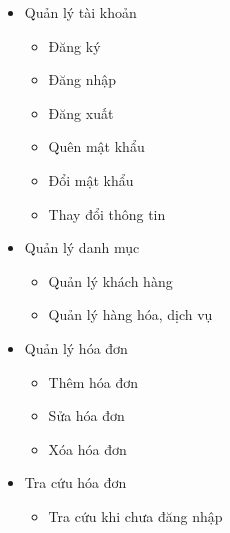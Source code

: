 
\begin{itemize}

    \item Quản lý tài khoản

          \begin{itemize}

              \item Đăng ký

              \item Đăng nhập

              \item Đăng xuất

              \item Quên mật khẩu

              \item Đổi mật khẩu

              \item Thay đổi thông tin

          \end{itemize}

    \item Quản lý danh mục

          \begin{itemize}

              \item Quản lý khách hàng

              \item Quản lý hàng hóa, dịch vụ

          \end{itemize}

    \item Quản lý hóa đơn

          \begin{itemize}

              \item Thêm hóa đơn

              \item Sửa hóa đơn

              \item Xóa hóa đơn

          \end{itemize}

    \item Tra cứu hóa đơn

          \begin{itemize}

              \item Tra cứu khi chưa đăng nhập


\end{itemize}
\end{itemize}
